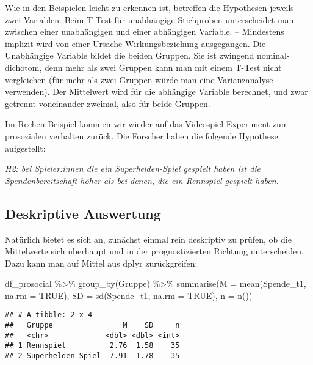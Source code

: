 \documentclass[
]{book}
\newenvironment{Shaded}{\begin{snugshade}}{\end{snugshade}}
\newcommand{\AttributeTok}[1]{\textcolor[rgb]{0.77,0.63,0.00}{#1}}
\newcommand{\ConstantTok}[1]{\textcolor[rgb]{0.00,0.00,0.00}{#1}}
\newcommand{\FunctionTok}[1]{\textcolor[rgb]{0.00,0.00,0.00}{#1}}
\newcommand{\NormalTok}[1]{#1}
\newcommand{\SpecialCharTok}[1]{\textcolor[rgb]{0.00,0.00,0.00}{#1}}
\begin{document}
Wie in den Beispielen leicht zu erkennen ist, betreffen die Hypothesen jeweils zwei Variablen. Beim T-Test für unabhängige Stichproben unterscheidet man zwischen einer unabhängigen und einer abhängigen Variable. -- Mindestens implizit wird von einer Ursache-Wirkungsbeziehung ausgegangen. Die Unabhängige Variable bildet die beiden Gruppen. Sie ist zwingend nominal-dichotom, denn mehr als zwei Gruppen kann man mit einem T-Test nicht vergleichen (für mehr als zwei Gruppen würde man eine Varianzanalyse verwenden). Der Mittelwert wird für die abhängige Variable berechnet, und zwar getrennt voneinander zweimal, also für beide Gruppen.

Im Rechen-Beispiel kommen wir wieder auf das Videospiel-Experiment zum prosozialen verhalten zurück. Die Forscher haben die folgende Hypothese aufgestellt:

\emph{H2: bei Spieler:innen die ein Superhelden-Spiel gespielt haben ist die Spendenbereitschaft höher als bei denen, die ein Rennspiel gespielt haben.}

\hypertarget{deskriptive-auswertung}{%
\subsection{Deskriptive Auswertung}\label{deskriptive-auswertung}}

Natürlich bietet es sich an, zunächst einmal rein deskriptiv zu prüfen, ob die Mittelwerte sich überhaupt und in der prognostizierten Richtung unterscheiden. Dazu kann man auf Mittel aus dplyr zurückgreifen:

\begin{Shaded}
\begin{Highlighting}[]
\NormalTok{df\_prosocial }\SpecialCharTok{\%\textgreater{}\%} 
  \FunctionTok{group\_by}\NormalTok{(Gruppe) }\SpecialCharTok{\%\textgreater{}\%} 
  \FunctionTok{summarise}\NormalTok{(}\AttributeTok{M =} \FunctionTok{mean}\NormalTok{(Spende\_t1, }\AttributeTok{na.rm =} \ConstantTok{TRUE}\NormalTok{), }
            \AttributeTok{SD =} \FunctionTok{sd}\NormalTok{(Spende\_t1, }\AttributeTok{na.rm =} \ConstantTok{TRUE}\NormalTok{), }
            \AttributeTok{n =} \FunctionTok{n}\NormalTok{())}
\end{Highlighting}
\end{Shaded}

\begin{verbatim}
## # A tibble: 2 x 4
##   Gruppe                M    SD     n
##   <chr>             <dbl> <dbl> <int>
## 1 Rennspiel          2.76  1.58    35
## 2 Superhelden-Spiel  7.91  1.78    35
\end{verbatim}
\end{document}

